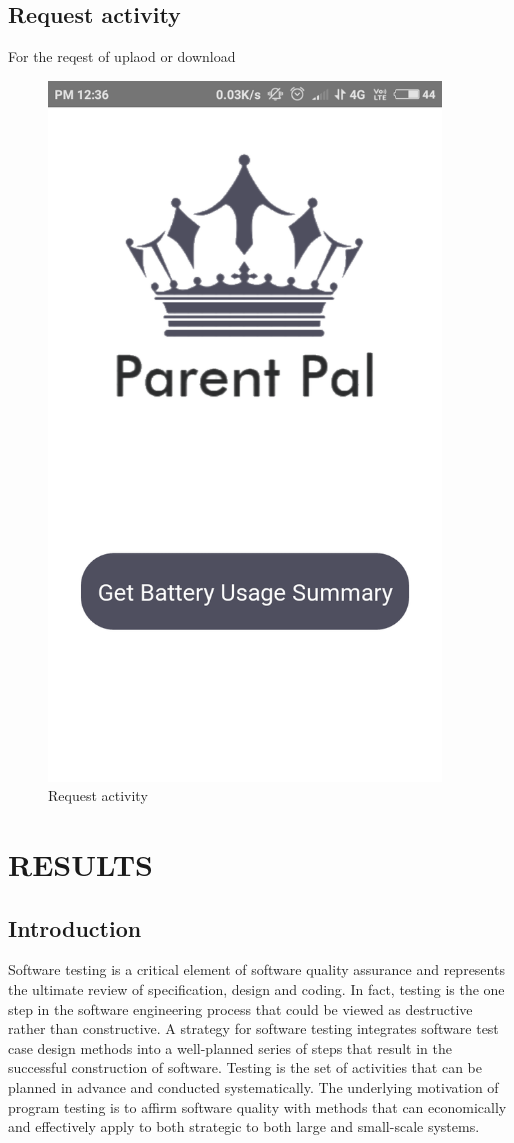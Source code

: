 \section{Request activity}
For the reqest of uplaod or download
\begin{figure}[!h]
	\centering
	\includegraphics[height=7.3in]{Batuse.PNG}
	\caption{Request activity}
\end{figure}

\newpage
\chapter{RESULTS}
\section{Introduction}
Software testing is a critical element of software quality assurance and represents the ultimate review of specification, design and coding. In fact, testing is the one step in the software engineering process that could be viewed as destructive rather than constructive.
A strategy for software testing integrates software test case design methods into a well-planned series of steps that result in the successful construction of software. Testing is the set of activities that can be planned in advance and conducted systematically. The underlying motivation of program testing is to affirm software quality with methods that can economically and effectively apply to both strategic to both large and small-scale systems.

